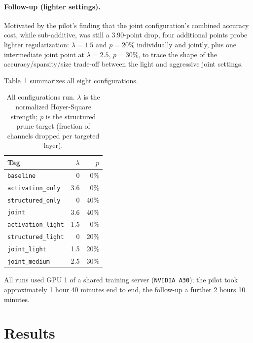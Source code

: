 \documentclass[11pt]{article}
\newcommand{\code}[1]{\texttt{#1}}
\begin{document}
\paragraph{Follow-up (lighter settings).} Motivated by the pilot's finding that the joint configuration's combined accuracy cost, while sub-additive, was still a 3.90-point drop, four additional points probe lighter regularization: $\lambda=1.5$ and $p=20\%$ individually and jointly, plus one intermediate joint point at $\lambda=2.5$, $p=30\%$, to trace the shape of the accuracy/sparsity/size trade-off between the light and aggressive joint settings.

Table~\ref{tab:configs} summarizes all eight configurations.

\begin{table}[H]
\centering
\caption{All configurations run. $\lambda$ is the normalized Hoyer-Square strength; $p$ is the structured prune target (fraction of channels dropped per targeted layer).}
\label{tab:configs}
\begin{tabular}{@{}lrr@{}}
\toprule
Tag & $\lambda$ & $p$ \\
\midrule
\code{baseline} & 0 & 0\% \\
\code{activation\_only} & 3.6 & 0\% \\
\code{structured\_only} & 0 & 40\% \\
\code{joint} & 3.6 & 40\% \\
\code{activation\_light} & 1.5 & 0\% \\
\code{structured\_light} & 0 & 20\% \\
\code{joint\_light} & 1.5 & 20\% \\
\code{joint\_medium} & 2.5 & 30\% \\
\bottomrule
\end{tabular}
\end{table}

All runs used GPU 1 of a shared training server (\code{NVIDIA A30}); the pilot took approximately 1 hour 40 minutes end to end, the follow-up a further 2 hours 10 minutes.

\section{Results}
\label{sec:results}
\end{document}
